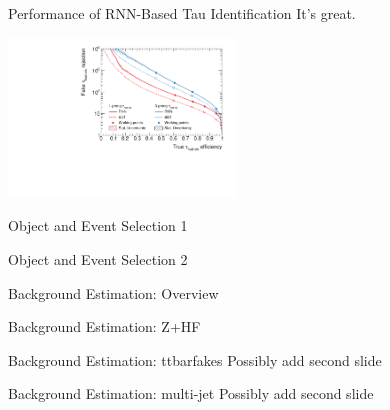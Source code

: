 \documentclass[11pt, xcolor={dvipsnames}, aspectratio=169]{beamer}
\begin{document}
\begin{frame}{Performance of RNN-Based Tau Identification}
  It's great.

  \includegraphics[width=0.45\textwidth]{tauid/roc_incl_witherrors}
\end{frame}


\begin{frame}{Object and Event Selection 1}
\end{frame}


\begin{frame}{Object and Event Selection 2}
\end{frame}


\begin{frame}{Background Estimation: Overview}
\end{frame}


\begin{frame}{Background Estimation: Z+HF}
\end{frame}


\begin{frame}{Background Estimation: ttbarfakes}
  Possibly add second slide
\end{frame}


\begin{frame}{Background Estimation: multi-jet}
  Possibly add second slide
\end{frame}
\end{document}
